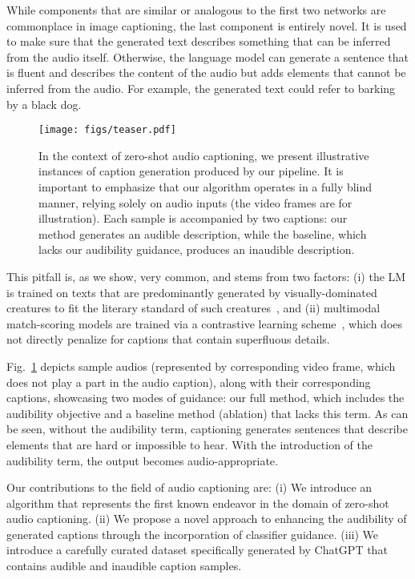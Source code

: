 \documentclass{article}
\begin{document}
While components that are similar or analogous to the first two networks are commonplace in image captioning, the last component is entirely novel. It is used to make sure that the generated text describes something that can be inferred from the audio itself. Otherwise, the language model can generate a sentence that is fluent and describes the content of the audio but adds elements that cannot be inferred from the audio. For example, the generated text could refer to barking by a black dog.

\begin{figure}[t]
    \centering
    \texttt{[image: figs/teaser.pdf]}
    \vspace{-8mm}
    \caption{In the context of zero-shot audio captioning, we present illustrative instances of caption generation produced by our pipeline. It is important to emphasize that our algorithm operates in a fully blind manner, relying solely on audio inputs (the video frames are for illustration). Each sample is accompanied by two captions: our method generates an audible description, while the baseline, which lacks our audibility guidance, produces an inaudible description.}
    \label{fig:teaser}
    \vspace{-4mm}
\end{figure}

This pitfall is, as we show, very common, and stems from two factors: (i) the LM is trained on texts that are predominantly generated by visually-dominated creatures to fit the literary standard of such creatures~\cite{hutmacher2019there}, and (ii) multimodal match-scoring models are trained via a contrastive learning scheme~\cite{oord2018representation}, which does not directly penalize for captions that contain superfluous details. 

Fig.~\ref{fig:teaser} depicts sample audios (represented by corresponding video frame, which does not play a part in the audio caption), along with their corresponding captions, showcasing two modes of guidance: our full method, which includes the audibility objective and a baseline method (ablation) that lacks this term. As can be seen, without the audibility term, captioning generates sentences that describe elements that are hard or impossible to hear. With the introduction of the audibility term, the output becomes audio-appropriate. 

Our contributions to the field of audio captioning are:
(i) We introduce an algorithm that represents the first known endeavor in the domain of zero-shot audio captioning.
(ii) We propose a novel approach to enhancing the audibility of generated captions through the incorporation of classifier guidance. 
(iii) We introduce a carefully curated dataset specifically generated by ChatGPT that contains audible and inaudible caption samples. 
\end{document}
